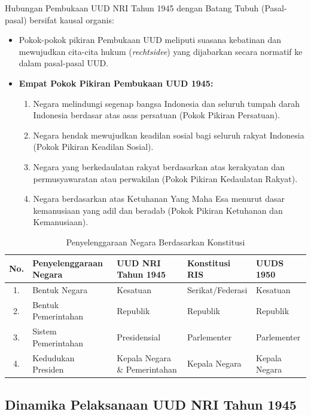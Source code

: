 Hubungan Pembukaan UUD NRI Tahun 1945 dengan Batang Tubuh (Pasal-pasal) bersifat kausal organis:
\begin{itemize}
\item Pokok-pokok pikiran Pembukaan UUD meliputi suasana kebatinan dan mewujudkan cita-cita hukum (\textit{rechtsidee}) yang dijabarkan secara normatif ke dalam pasal-pasal UUD.
\item \textbf{Empat Pokok Pikiran Pembukaan UUD 1945:}
  \begin{enumerate}
  \item Negara melindungi segenap bangsa Indonesia dan seluruh tumpah darah Indonesia berdasar atas asas persatuan (Pokok Pikiran Persatuan).
  \item Negara hendak mewujudkan keadilan sosial bagi seluruh rakyat Indonesia (Pokok Pikiran Keadilan Sosial).
  \item Negara yang berkedaulatan rakyat berdasarkan atas kerakyatan dan permusyawaratan atau perwakilan (Pokok Pikiran Kedaulatan Rakyat).
  \item Negara berdasarkan atas Ketuhanan Yang Maha Esa menurut dasar kemanusiaan yang adil dan beradab (Pokok Pikiran Ketuhanan dan Kemanusiaan).
  \end{enumerate}
\end{itemize}

\begin{table}[h]
  \centering
  \caption{Penyelenggaraan Negara Berdasarkan Konstitusi}
  \begin{tabular}{|c|l|l|l|l|}
    \hline
    \textbf{No.} & \textbf{Penyelenggaraan Negara} & \textbf{UUD NRI Tahun 1945} & \textbf{Konstitusi RIS} & \textbf{UUDS 1950} \\ \hline
    1. & Bentuk Negara & Kesatuan & Serikat/Federasi & Kesatuan \\ \hline
    2. & Bentuk Pemerintahan & Republik & Republik & Republik \\ \hline
    3. & Sistem Pemerintahan & Presidensial & Parlementer & Parlementer \\ \hline
    4. & Kedudukan Presiden & Kepala Negara \& Pemerintahan & Kepala Negara & Kepala Negara \\ \hline
  \end{tabular}
\end{table}

\subsection{Dinamika Pelaksanaan UUD NRI Tahun 1945}

